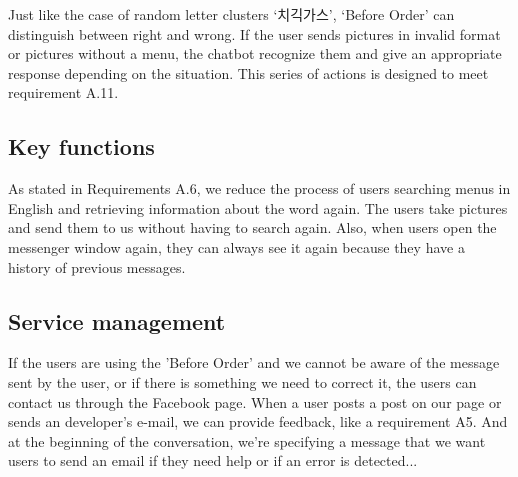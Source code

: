 Just like the case of random letter clusters ‘치긱가스’, ‘Before Order’ can distinguish between right and wrong. If the user sends pictures in invalid format or pictures without a menu, the chatbot recognize them and give an appropriate response depending on the situation. This series of actions is designed to meet requirement A.11.


\subsection{Key functions}
As stated in Requirements A.6, we reduce the process of users searching menus in English and retrieving information about the word again. The users take pictures and send them to us without having to search again. Also, when users open the messenger window again, they can always see it again because they have a history of previous messages.

\subsection{Service management}
If the users are using the 'Before Order' and we cannot be aware of the message sent by the user, or if there is something we need to correct it, the users can contact us through the Facebook page. When a user posts a post on our page or sends an developer’s e-mail, we can provide feedback, like a requirement A5. And at the beginning of the conversation, we're specifying a message that we want users to send an email if they need help or if an error is detected...











